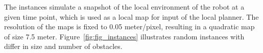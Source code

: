 The instances simulate a snapshot of the local environment of the robot at a given time point, which is used as a local map for input of the local planner.
The resolution of the maps is fixed to 0.05 meter/pixel, resulting in a quadratic map of size 7.5 meter. Figure~\ref{fig:fig_instances} illustrates random instances with differ in size and number of obstacles. 
\begin{figure}[thpb]
     \footnotesize
      \centering
      \myfloatalign
      \setlength\fboxsep{0pt}
      \setlength\fboxrule{0.5pt}
       \\ 
\end{figure}
